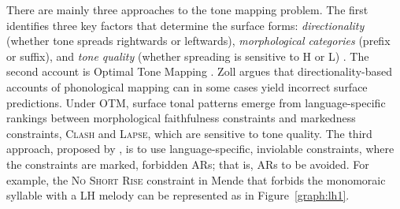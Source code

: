 There are mainly three approaches to the tone mapping problem. The
first identifies three key factors that determine the surface forms:
\textit{directionality} (whether tone spreads rightwards or leftwards), 
\textit{morphological categories }(prefix or suffix), and \textit{tone quality}
(whether spreading is sensitive to H or L) \citep{hyman1987prosodic,
	leben2017tone, hyman2009representation}. The second account is Optimal 
	Tone Mapping \citep[OTM;][]{zoll2003optimal}. 
Zoll argues that directionality-based accounts of
phonological mapping can in some cases yield incorrect surface
predictions. Under OTM, surface tonal patterns emerge from
language-specific rankings between morphological faithfulness
constraints and markedness constraints, \textsc{Clash} and
\textsc{Lapse}, which are sensitive to tone quality.
The third approach, proposed by \citet{jardine2017LocalNature}, 
is to use language-specific, inviolable constraints, where the
constraints are marked, forbidden ARs; that is, ARs to be
avoided. For example, the \textsc{No Short Rise} constraint in Mende
\citep{leben2017tone} that forbids the monomoraic syllable with a LH 
melody can be represented as in Figure~\ref{graph:lh1}.


